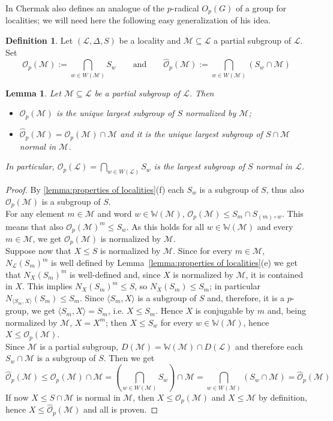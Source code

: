 \documentclass{amsart}
\numberwithin{equation}{section}
\newtheorem{lemma}[equation]{Lemma}
\theoremstyle{definition}
\newtheorem{definition}[equation]{Definition}
\theoremstyle{subresult}
\theoremstyle{caseresult}
\newcommand{\W}{\mathbb{W}}
\newcommand{\M}{\mathcal{M}}
\renewcommand{\L}{\mathcal{L}}
\newcommand{\coll}{\mathcal{O}}
\newcommand{\<}{\langle}
\renewcommand{\>}{\rangle}
\begin{document}
\vspace{0.4cm}
In \cite[Lemma 2.13]{Chermak:2022:I} Chermak also defines an analogue of the $p$-radical $O_p(G)$ of a group for localities; we will need here the following easy generalization of his idea.

	\begin{definition}\label{def:O-p of a partial subgr of local}
		Let $(\L, \Delta, S)$ be a locality and $\M \subseteq \L$ a partial subgroup of $\L$. Set
		\[
		\coll_p(\M) := \bigcap_{w \in W(\M)} S_w \qquad \text{and} \qquad \hat{\coll}_p(\M) := \bigcap_{w \in W(\M)} (S_w \cap \M)
		\]
	\end{definition}
	
	\begin{lemma}\label{lemma:Op-of-part-subgr}
		Let $\M \subseteq \L$ be a partial subgroup of $\L$. Then 
		\begin{itemize}
			\item $\coll_p(\M)$ is the unique largest subgroup of $S$ normalized by $\M$;
			\item $\hat{\coll}_p(\M) = \coll_p(\M) \cap \M$ and it is the unique largest subgroup of $S \cap \M$ normal in $\M$.
		\end{itemize}
	In particular, $\displaystyle \coll_p(\L) = \bigcap_{w \in W(\L)} S_w$ is the largest subgroup of $S$ normal in $\L$.
	\end{lemma}
	\begin{proof}
		By \ref{lemma:properties of localities}(f) each $S_w$ is a subgroup of $S$, thus also $\coll_p(\M)$ is a subgroup of $S$.\\
		For any element $m \in \M$ and word $w \in \W(\M)$, $\coll_p(\M) \le S_m \cap S_{(m) \circ w}$. This means that also $\coll_p(\M)^m \le S_w$. As this holds for all $w \in \W(\M)$ and every $m \in \M$, we get $\coll_p(\M)$ is normalized by $\M$.\\
		Suppose now that $X \le S$ is normalized by $\M$. Since for every $m \in \M$, $N_\L(S_m)^m$ is well defined by Lemma~\ref{lemma:properties of localities}(e) we get that $N_X(S_m)^m$ is well-defined and, since $X$ is normalized by $\M$, it is contained in $X$. This implies $N_X(S_m)^m \le S$, so $N_X(S_m) \le S_m$; in particular $N_{\<S_m, X\>}(S_m) \le S_m$. Since $\<S_m,X\>$ is a subgroup of $S$ and, therefore, it is a $p$-group, we get $\<S_m,X \>= S_m$, i.e. $X \le S_m$. Hence $X$ is conjugable by $m$ and, being normalized by $\M$, $X=X^m$; then $X \le S_w$ for every $w \in \W(\M)$, hence $X \le \coll_p(\M)$.\\
		
		Since $\M$ is a partial subgroup, $D(\M) = \W(\M) \cap D(\L)$ and therefore each $S_w \cap \M$ is a subgroup of $S$.  Then we get
		\[
			\hat{\coll}_p(\M) \le \coll_p(\M) \cap \M = \left( \bigcap_{w \in W(\M)} S_w \right) \cap \M = \bigcap_{w \in W(\M)} (S_w \cap \M) = \hat{\coll}_p(\M)
		\]
		If now $X \le S \cap \M$ is normal in $\M$, then $X \le \coll_p(\M)$ and $X \le \M$ by definition, hence $X \le \hat{\coll}_p(\M)$ and all is proven.
	\end{proof}	
\end{document}
